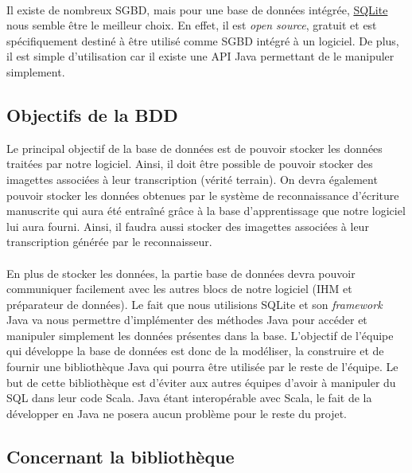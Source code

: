 \paragraph{}
Il existe de nombreux SGBD, mais pour une base de données intégrée,
\href{https://sqlite.org/index.html}{SQLite} nous semble être le meilleur
choix. En effet, il est \textit{open source}, gratuit et est spécifiquement
destiné à être utilisé comme SGBD intégré à un logiciel. De plus, il est
simple d’utilisation car il existe une API Java permettant de le manipuler
simplement.

\subsection{Objectifs de la BDD}

Le principal objectif de la base de données est de pouvoir stocker les données
traitées par notre logiciel. Ainsi, il doit être possible de pouvoir stocker
des imagettes associées à leur transcription (vérité terrain). On devra
également pouvoir stocker les données obtenues par le système de reconnaissance
d’écriture manuscrite qui aura été entraîné grâce à la base d’apprentissage
que notre logiciel lui aura fourni. Ainsi, il faudra aussi stocker des
imagettes associées à leur transcription générée par le reconnaisseur.

\paragraph{}
En plus de stocker les données, la partie base de données devra pouvoir
communiquer facilement avec les autres blocs de notre logiciel (IHM et
préparateur de données). Le fait que nous utilisions SQLite et son
\textit{framework} Java va nous permettre d’implémenter des méthodes Java pour
accéder et manipuler simplement les données présentes dans la base. L’objectif
de l’équipe qui développe la base de données est donc de la modéliser, la
construire et de fournir une bibliothèque Java qui pourra être utilisée par le
reste de l’équipe. Le but de cette bibliothèque est d’éviter aux autres équipes
d’avoir à manipuler du SQL dans leur code Scala. Java étant interopérable avec
Scala, le fait de la développer en Java ne posera aucun problème pour le reste
du projet.

\subsection{Concernant la bibliothèque}

